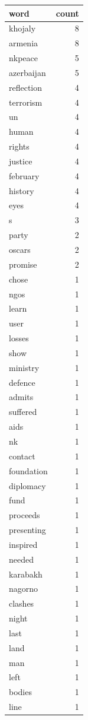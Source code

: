 \begin{tabular}{lr}
\toprule
word & count \\
\midrule
khojaly & 8 \\
armenia & 8 \\
nkpeace & 5 \\
azerbaijan & 5 \\
reflection & 4 \\
terrorism & 4 \\
un & 4 \\
human & 4 \\
rights & 4 \\
justice & 4 \\
february & 4 \\
history & 4 \\
eyes & 4 \\
s & 3 \\
party & 2 \\
oscars & 2 \\
promise & 2 \\
chose & 1 \\
ngos & 1 \\
learn & 1 \\
user & 1 \\
losses & 1 \\
show & 1 \\
ministry & 1 \\
defence & 1 \\
admits & 1 \\
suffered & 1 \\
aids & 1 \\
nk & 1 \\
contact & 1 \\
foundation & 1 \\
diplomacy & 1 \\
fund & 1 \\
proceeds & 1 \\
presenting & 1 \\
inspired & 1 \\
needed & 1 \\
karabakh & 1 \\
nagorno & 1 \\
clashes & 1 \\
night & 1 \\
last & 1 \\
land & 1 \\
man & 1 \\
left & 1 \\
bodies & 1 \\
line & 1 \\
\bottomrule
\end{tabular}

